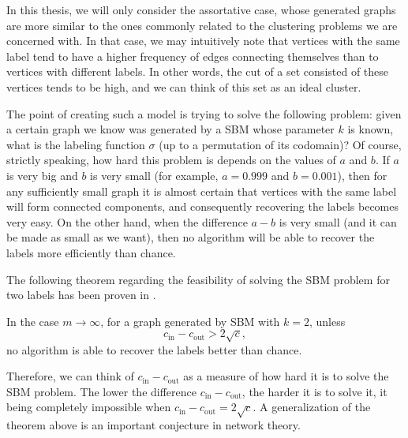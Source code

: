 In this thesis, we will only consider the assortative case, whose generated graphs are more similar to the ones commonly related to the clustering problems we are concerned with.
In that case, we may intuitively note that vertices with the same label tend to have a higher frequency of edges connecting themselves than to vertices with different labels.
In other words, the cut of a set consisted of these vertices tends to be high, and we can think of this set as an ideal cluster.

The point of creating such a model is trying to solve the following problem: given a certain graph we know was generated by a SBM whose parameter $k$ is known, what is the labeling function $\sigma$ (up to a permutation of its codomain)?
Of course, strictly speaking, how hard this problem is depends on the values of $a$ and $b$. 
If $a$ is very big and $b$ is very small (for example, $a = 0.999$ and $b = 0.001$), then for any sufficiently small graph it is almost certain that vertices with the same label will form  connected components, and consequently recovering the labels becomes very easy.
On the other hand, when the difference $a-b$ is very small (and it can be made as small as we want), then no algorithm will be able to recover the labels more efficiently than chance.

The following theorem regarding the feasibility of solving the SBM problem for two labels has been proven in \cite{ramanujan}. 

\begin{theorem}
In the case $m \rightarrow \infty$, for a graph generated by SBM with $k = 2$, unless
   \begin{equation}
      c_\text{in} - c_\text{out} > 2 \sqrt{c},
   \end{equation}
   no algorithm is able to recover the labels better than chance.
\end{theorem}

Therefore, we can think of $c_\text{in} - c_\text{out}$ as a measure of how hard it is to solve the SBM problem.
The lower the difference $c_\text{in} - c_\text{out}$, the harder it is to solve it, it being completely impossible when $c_\text{in} - c_\text{out} = 2 \sqrt{c}$.
A generalization of the theorem above is an important conjecture in network theory.

